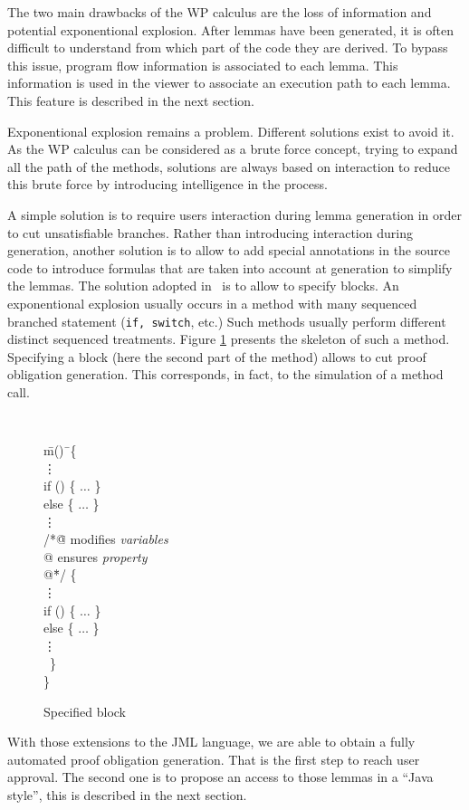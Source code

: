  The two main drawbacks of the WP calculus are the loss of information and
 potential exponentional explosion.  After lemmas have been generated,
 it is often difficult to understand from which part of the code they
 are derived.  To bypass this issue, program flow information is
 associated to each lemma.  This information is used in the viewer
 to associate an execution path to each lemma. This feature is described in the next section.

 Exponentional explosion remains a problem.  Different solutions exist
 to avoid it.  As the WP calculus can be considered as a brute
 force concept, trying to expand all the path of the methods,
 solutions are always based on interaction to reduce this brute force
 by introducing intelligence in the process.

 A simple solution is to require users interaction during lemma
 generation in order to cut unsatisfiable branches.  Rather than introducing
 interaction during generation, another solution is to allow to add
 special annotations in the source code to introduce formulas that are
 taken into account at generation to simplify the lemmas.
 The solution adopted in \JACK\ is to allow to specify blocks. An exponentional explosion usually occurs
in a method with many sequenced branched statement ({\tt if, switch}, etc.) Such methods usually perform
different distinct sequenced treatments.
 Figure \ref{Specified_block} presents the skeleton of such a method. Specifying a block (here the second part
of the method) allows to cut proof obligation generation. This corresponds, in fact, to the simulation of a
method call.
\begin{figure}[htp]
{\tt
\begin{tabbing}
 \hspace{3 cm} \=m()\= \ \{ \\
 \> \> \vdots \\
 \> \> if () \{ $\hdots$ \} \\
 \> \> else \{ $\hdots$ \}   \\
 \> \> \vdots                   \\
 \> \> /*\=@ modifies {\it variables}  \\
 \> \> \> @ ensures {\it property} \\
 \> \> \> @\=*/ \{ \\
 \> \> \> \> \vdots \\
 \> \> \> \> if () \{ $\hdots$ \} \\
 \> \> \> \> else \{ $\hdots$ \}   \\
 \> \> \> \> \vdots                   \\
 \> \> \ \} \\
 \> \> \}
\end{tabbing}
}
 \caption{Specified block}
 \label{Specified_block}
\end{figure}

 With those extensions to the JML language, we are able to obtain a fully automated proof obligation generation.
That is the first step to reach user approval. The second one is to propose an access to those lemmas in a
``Java style'', this is described in the next section.
